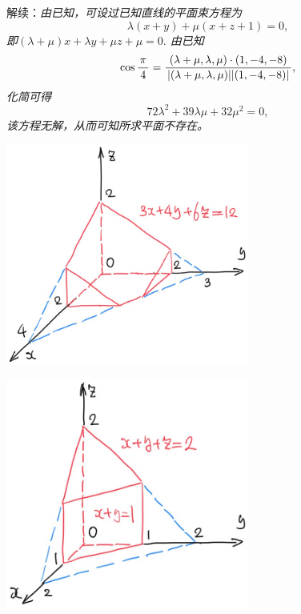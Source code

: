 \begin{frame}
	\linespread{1.5}
	\pause
	
	\bigskip
	
	\small 解续：\it 由已知，可设过已知直线的平面束方程为
	$$\lambda(x+y)+\mu(x+z+1)=0,$$
	即$(\lambda+\mu)x+\lambda y+\mu z+\mu=0.$
	由已知
	$$\cos\displaystyle\frac{\,{\pi}\,}{\,{4}\,}=\displaystyle\frac{\,{(\lambda+\mu,\lambda,\mu)\cdot
	(1,-4,-8)}\,}{\,{|(\lambda+\mu,\lambda,\mu)||(1,-4,-8)|}\,},$$
	化简可得
	$$72\lambda^2+39\lambda\mu+32\mu^2=0,$$
	该方程无解，从而可知所求平面不存在。
	\fin
\end{frame}

\begin{frame}
	\linespread{1.5}
	
	\bigskip
	
	\begin{center}
		\includegraphics[width=0.6\textwidth]{./images/ch8/xyz12.jpg}
	\end{center}
\end{frame}

\begin{frame}
	\linespread{1.5}
	
	\bigskip
	
	\begin{center}
		\includegraphics[width=0.6\textwidth]{./images/ch8/xyz2.jpg}
	\end{center}
\end{frame}

